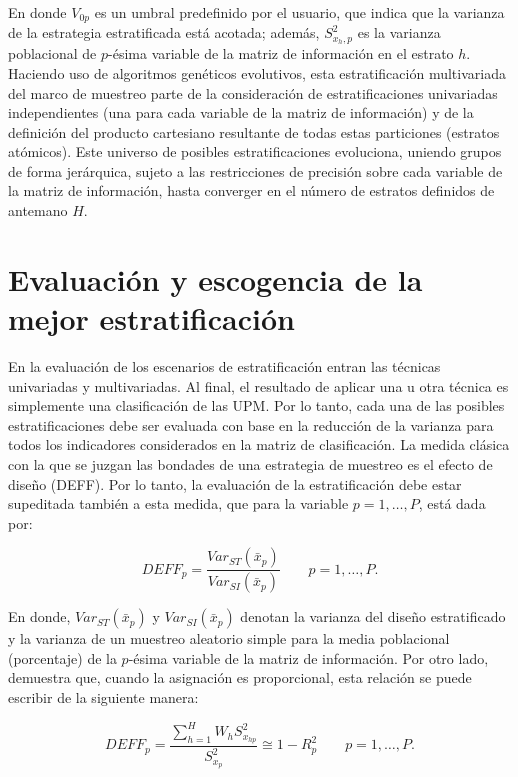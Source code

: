\documentclass[
  12pt,
  spanish,
]{book}
\begin{document}
En donde \(V_{0p}\) es un umbral predefinido por el usuario, que indica que la varianza de la estrategia estratificada está acotada; además, \(S^2_{x_h,p}\) es la varianza poblacional de \(p\)-ésima variable de la matriz de información en el estrato \(h\).
Haciendo uso de algoritmos genéticos evolutivos, esta estratificación multivariada del marco de muestreo parte de la consideración de estratificaciones univariadas independientes (una para cada variable de la matriz de información) y de la definición del producto cartesiano resultante de todas estas particiones (estratos atómicos). Este universo de posibles estratificaciones evoluciona, uniendo grupos de forma jerárquica, sujeto a las restricciones de precisión sobre cada variable de la matriz de información, hasta converger en el número de estratos definidos de antemano \(H\).

\hypertarget{evaluaciuxf3n-y-escogencia-de-la-mejor-estratificaciuxf3n}{%
\section{Evaluación y escogencia de la mejor estratificación}\label{evaluaciuxf3n-y-escogencia-de-la-mejor-estratificaciuxf3n}}

En la evaluación de los escenarios de estratificación entran las técnicas univariadas y multivariadas. Al final, el resultado de aplicar una u otra técnica es simplemente una clasificación de las UPM. Por lo tanto, cada una de las posibles estratificaciones debe ser evaluada con base en la reducción de la varianza para todos los indicadores considerados en la matriz de clasificación. La medida clásica con la que se juzgan las bondades de una estrategia de muestreo es el efecto de diseño (DEFF). Por lo tanto, la evaluación de la estratificación debe estar supeditada también a esta medida, que para la variable \(p = 1, \ldots, P\), está dada por:

\[
DEFF_p = \frac{Var_{ST}(\bar x _p)}{Var_{SI}(\bar x _p)} \ \ \ \ \ \ \ \ \ p = 1, \ldots, P.
\]

En donde, \(Var_{ST}(\bar x _p)\) y \(Var_{SI}(\bar x _p)\) denotan la varianza del diseño estratificado y la varianza de un muestreo aleatorio simple para la media poblacional (porcentaje) de la \(p\)-ésima variable de la matriz de información. Por otro lado, \citet[página 184]{Gutierrez_2016} demuestra que, cuando la asignación es proporcional, esta relación se puede escribir de la siguiente manera:

\[
DEFF_p = \frac{ \sum_{h=1}^H W_h S^2_{x_{hp}} }{S^2_{x_p}} \cong 1 - R^2_p \ \ \ \ \ \ \ \ \ p = 1, \ldots, P.
\]
\end{document}
